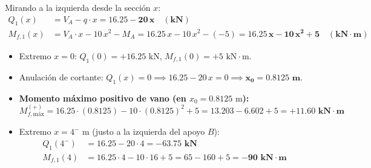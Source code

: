 {    

    Mirando a la izquierda desde la sección $x$:
    \begin{align}
        Q_1(x)   & = V_A - q \cdot x = \mathbf{16.25 - 20\,x \quad (\text{kN})}                                       \\
        M_{f,1}(x)& = V_A \cdot x - 10\,x^2 - M_A = 16.25\,x - 10\,x^2 - (-5) = \mathbf{16.25\,x - 10\,x^2 + 5 \quad (\text{kN}\cdot\text{m})}
    \end{align}
    \begin{itemize}
        \item Extremo $x = 0$: $Q_1(0) = +16.25\text{ kN}$, \quad $M_{f,1}(0) = +5\text{ kN}\cdot\text{m}$.
        \item Anulación de cortante: $Q_1(x) = 0 \implies 16.25 - 20\,x = 0 \implies \mathbf{x_0 = 0.8125\text{ m}}$.
        \item \textbf{Momento máximo positivo de vano (en $x_0 = 0.8125\text{ m}$):}
              \begin{equation}
                  M_{f,\text{máx}}^{(+)} = 16.25 \cdot (0.8125) - 10 \cdot (0.8125)^2 + 5 = 13.203 - 6.602 + 5 = \mathbf{+11.60\text{ kN}\cdot\text{m}}
              \end{equation}
        \item Extremo $x = 4^-\text{ m}$ (justo a la izquierda del apoyo $B$):
              \begin{align}
                  Q_1(4^-)   & = 16.25 - 20 \cdot 4 = \mathbf{-63.75\text{ kN}} \\
                  M_{f,1}(4) & = 16.25 \cdot 4 - 10 \cdot 16 + 5 = 65 - 160 + 5 = \mathbf{-90\text{ kN}\cdot\text{m}}
              \end{align}
    \end{itemize}

}
